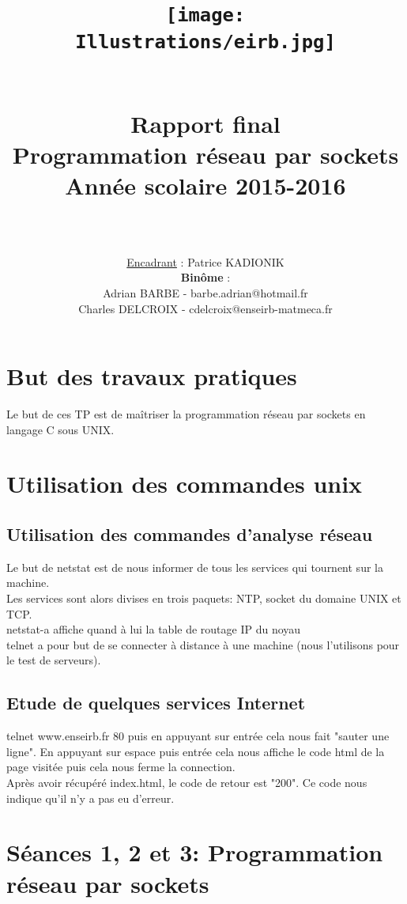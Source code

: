 \documentclass[paper=a4, fontsize=12pt]{article}
\title{
\begin{figure}[H]
\centering
\texttt{[image: Illustrations/eirb.jpg]}
\end{figure}
  \usefont{OT1}{bch}{b}{n}
  \horrule{1.5pt} \\[0.5cm]	
  \Huge \textbf{Rapport final} \\ [10pt]
  \Huge Programmation réseau par sockets \\ [15pt]
  \LARGE Année scolaire 2015-2016 \\ 
  \horrule{1.5pt} \\[0.5cm]
}
\author{
  \huge \underline{Encadrant} : \LARGE Patrice KADIONIK\\[20pt]
  \normalfont 							
  \huge \textbf{Binôme} :\\[10pt]
\Large Adrian BARBE - barbe.adrian@hotmail.fr\\[5pt]
 \Large Charles DELCROIX - cdelcroix@enseirb-matmeca.fr \\[5pt]
  \normalsize
}
\date{}
\numberwithin{equation}{section}		%
\numberwithin{figure}{section}			%
\numberwithin{table}{section}				%
\begin{document}
\maketitle
\newpage

\tableofcontents

\newpage
\section{But des travaux pratiques}
Le but de ces TP est de maîtriser la programmation réseau par sockets en langage C sous UNIX.
\section{Utilisation des commandes unix}
\subsection{Utilisation des commandes d'analyse réseau}
Le but de netstat est de nous informer de tous les services qui tournent sur la machine.\\
Les services sont alors divises en trois paquets: NTP, socket du domaine UNIX et TCP.\\
netstat-a affiche quand à lui la table de routage IP du noyau
\\telnet a pour but de se connecter à distance à une machine (nous l'utilisons pour le test de serveurs).
\subsection{Etude de quelques services Internet}
telnet www.enseirb.fr 80 puis en appuyant sur entrée cela nous fait "sauter une ligne". En appuyant sur espace puis entrée cela nous affiche le code html de la page visitée puis cela nous ferme la connection.
\\Après avoir récupéré index.html, le code de retour est "200". Ce code nous indique qu'il n'y a pas eu d'erreur.
\section{Séances 1, 2 et 3: Programmation réseau par sockets}
\end{document}
